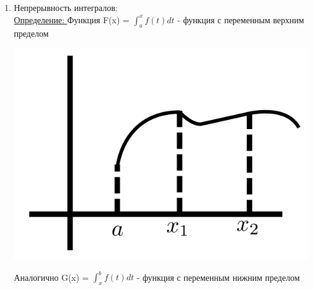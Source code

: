 \documentclass[12pt]{article}
\let\ORIincludegraphics\includegraphics
\renewcommand{\includegraphics}[2][]{\ORIincludegraphics[scale=0.65,#1]{#2}}
\begin{document}
\begin{enumerate}
\begin{adjustwidth}{1.5em}{1.5em}
\begin{adjustwidth}{1.5em}{1.5em}
\begin{math}
                    =\sigma_R(|f|)\\
                    \lim_{\lambda_R \to 0}|\sigma_R|=|\int_{a}^{b}f(x)dx|\leq \lim_{\lambda_R \to 0}\sigma_R (|f|)=\int_{a}^{b}|f(x)|dx\\
                \end{math}
            \end{adjustwidth}
        \end{adjustwidth}
        \item Непрерывность интегралов:\\
        \underline{Определение: } Функция F(x) = $\int_{a}^{x}f(t)dt$ - функция с переменным верхним пределом\\
        \begin{center}
            \includegraphics[width=0.6\linewidth]{6.7.1.png}
        \end{center}
        Аналогично G(x) = $\int_{x}^{b}f(t)dt$ - функция с переменным нижним пределом

\end{enumerate}
\end{document}
